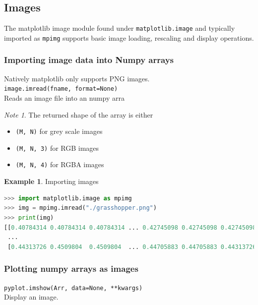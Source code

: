 \documentclass{article}
\theoremstyle{definition}
\newtheorem{ex}{Example}[subsection]
\theoremstyle{remark}
\newtheorem*{nb}{Note}
\newcommand{\func}[2]{\noindent\lstinline{#1}\\#2}
\begin{document}
\break



\subsection{Images}

The matplotlib image module found under \lstinline{matplotlib.image} and typically imported as \lstinline{mpimg} supports basic image loading, rescaling and display operations.

\subsubsection{Importing image data into Numpy arrays}

Natively matplotlib only supports PNG images.\\

\func{image.imread(fname, format=None)}{Reads an image file into an numpy arra}

\begin{nb}
The returned shape of the array is either

\begin{itemize}
    \item \lstinline{(M, N)} for grey scale images

    \item \lstinline{(M, N, 3)} for RGB images

    \item \lstinline{(M, N, 4)} for RGBA images
\end{itemize}
\end{nb}

\begin{ex}Importing images
\begin{lstlisting}[language=Python]
>>> import matplotlib.image as mpimg
>>> img = mpimg.imread("./grasshopper.png")
>>> print(img)
[[0.40784314 0.40784314 0.40784314 ... 0.42745098 0.42745098 0.42745098]
 ...
 [0.44313726 0.4509804  0.4509804  ... 0.44705883 0.44705883 0.44313726]]
\end{lstlisting}
\end{ex}

\subsubsection{Plotting numpy arrays as images}

\func{pyplot.imshow(Arr, data=None, **kwargs)}{Display an image.}
\end{document}
